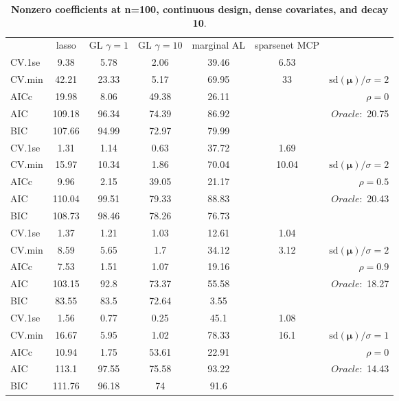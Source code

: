 \begin{table}\vspace{-.5cm}
\caption[l]{ { \bf Nonzero coefficients at n=100, continuous design, 
dense covariates, and  decay  10}.}
\vspace{-.5cm}
\footnotesize{}
\begin{center}
\begin{tabular}{l*{5}{c}|r}
& lasso & GL $\gamma=1$ & GL $\gamma=10$ & marginal AL & sparsenet MCP  & \\
 \cline{1-7}
CV.1se & 9.38 & 5.78 & 2.06 & 39.46 & 6.53 & \\
CV.min & 42.21 & 23.33 & 5.17 & 69.95 & 33 &  $\mathrm{sd}(\mathbf{\mu})/\sigma=2$ \\
AICc & 19.98 & 8.06 & 49.38 & 26.11 & & $\rho=0$ \\
AIC & 109.18 & 96.34 & 74.39 & 86.92 & &  \multirow{2}{*}{$Oracle: $ 20.75} \\
BIC & 107.66 & 94.99 & 72.97 & 79.99 & &  \\
 \hline 
CV.1se & 1.31 & 1.14 & 0.63 & 37.72 & 1.69 & \\
CV.min & 15.97 & 10.34 & 1.86 & 70.04 & 10.04 &  $\mathrm{sd}(\mathbf{\mu})/\sigma=2$ \\
AICc & 9.96 & 2.15 & 39.05 & 21.17 & & $\rho=0.5$ \\
AIC & 110.04 & 99.51 & 79.33 & 88.83 & &  \multirow{2}{*}{$Oracle: $ 20.43} \\
BIC & 108.73 & 98.46 & 78.26 & 76.73 & &  \\
 \hline 
CV.1se & 1.37 & 1.21 & 1.03 & 12.61 & 1.04 & \\
CV.min & 8.59 & 5.65 & 1.7 & 34.12 & 3.12 &  $\mathrm{sd}(\mathbf{\mu})/\sigma=2$ \\
AICc & 7.53 & 1.51 & 1.07 & 19.16 & & $\rho=0.9$ \\
AIC & 103.15 & 92.8 & 73.37 & 55.58 & &  \multirow{2}{*}{$Oracle: $ 18.27} \\
BIC & 83.55 & 83.5 & 72.64 & 3.55 & &  \\
 \hline 
CV.1se & 1.56 & 0.77 & 0.25 & 45.1 & 1.08 & \\
CV.min & 16.67 & 5.95 & 1.02 & 78.33 & 16.1 &  $\mathrm{sd}(\mathbf{\mu})/\sigma=1$ \\
AICc & 10.94 & 1.75 & 53.61 & 22.91 & & $\rho=0$ \\
AIC & 113.1 & 97.55 & 75.58 & 93.22 & &  \multirow{2}{*}{$Oracle: $ 14.43} \\
BIC & 111.76 & 96.18 & 74 & 91.6 & &  \\

\end{tabular}
\end{center}
\end{table}
